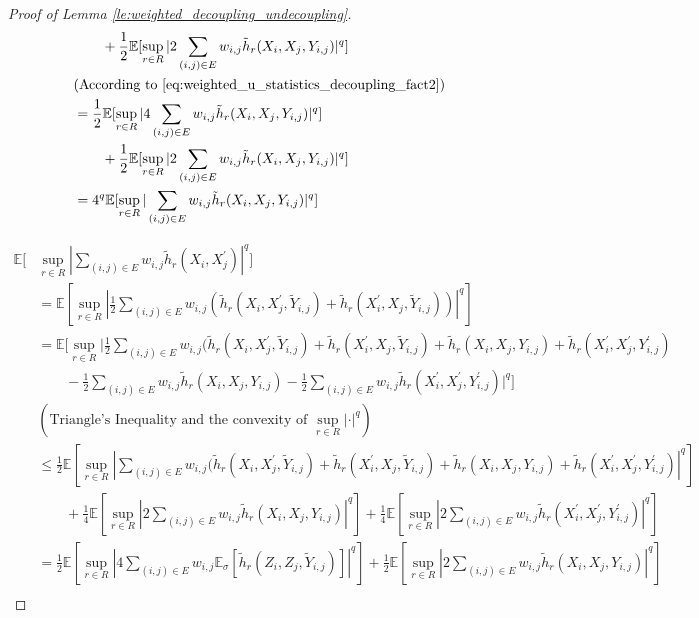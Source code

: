 \documentclass[letterpaper]{article} %
\def\DoubleColumnEnd{}
\def\SingleColumn{}
\newcommand{\E}{\mathbb{E}}
\newcommand{\pair}[1]{(#1)}
\begin{document}
\begin{proof}[Proof of Lemma \ref{le:weighted_decoupling_undecoupling}]
\begin{align*}
        &\qquad+ \frac{1}{2}\E[\sup_{r\in R} |2\sum_{\pair{i,j}\in E}w_{i,j}\tilde{h}_r(X_i,X_j,Y_{i,j})|^q]\\
        &(\text{According to }\eqref{eq:weighted_u_statistics_decoupling_fact2})\\
        &= \frac{1}{2}\E[\sup_{r\in R} |4\sum_{\pair{i,j}\in E}w_{i,j}\tilde{h}_r(X_i,X_j,Y_{i,j})|^q] \\
        &\qquad+ \frac{1}{2}\E[\sup_{r\in R} |2\sum_{\pair{i,j}\in E}w_{i,j}\tilde{h}_r(X_i,X_j,Y_{i,j})|^q]\\
        &= 4^q\E[\sup_{r\in R} |\sum_{\pair{i,j}\in E}w_{i,j}\tilde{h}_r(X_i,X_j,Y_{i,j})|^q]
    \end{align*}
    \DoubleColumnEnd
    \SingleColumn
    \begin{align*}
        \E[&\sup_{r\in R} |\sum_{\pair{i,j}\in E}w_{i,j}\tilde{h}_r(X_i,X_j^\prime)|^q]\\
        &=\E[\sup_{r\in R} |\frac{1}{2}\sum_{\pair{i,j}\in E}w_{i,j}(\tilde{h}_r(X_i,X_j^\prime,\tilde{Y}_{i,j})+\tilde{h}_r(X_i^\prime,X_j,\tilde{Y}_{i,j}))|^q]\\
        &= \E[\sup_{r\in R} |\frac{1}{2}\sum_{\pair{i,j}\in E}w_{i,j}(\tilde{h}_r(X_i,X_j^\prime,\tilde{Y}_{i,j})+\tilde{h}_r(X_i^\prime,X_j,\tilde{Y}_{i,j})+\tilde{h}_r(X_i,X_j,Y_{i,j})+\tilde{h}_r(X_i^\prime,X_j^\prime,Y^\prime_{i,j})\\
        &\qquad-\frac{1}{2}\sum_{\pair{i,j}\in E}w_{i,j}\tilde{h}_r(X_i,X_j,Y_{i,j})-\frac{1}{2}\sum_{\pair{i,j}\in E}w_{i,j}\tilde{h}_r(X_i^\prime,X_j^\prime,Y^\prime_{i,j})|^q]\\
        &(\text{Triangle's Inequality and the convexity of }\sup_{r\in R}|\cdot|^q)\\
        &\le \frac{1}{2}\E[\sup_{r\in R} |\sum_{\pair{i,j}\in E}w_{i,j}(\tilde{h}_r(X_i,X_j^\prime,\tilde{Y}_{i,j})+\tilde{h}_r(X_i^\prime,X_j,\tilde{Y}_{i,j})+\tilde{h}_r(X_i,X_j,Y_{i,j})+\tilde{h}_r(X_i^\prime,X_j^\prime,Y^\prime_{i,j})|^q]\\
        &\qquad+\frac{1}{4}\E[\sup_{r\in R} |2\sum_{\pair{i,j}\in E}w_{i,j}\tilde{h}_r(X_i,X_j,Y_{i,j})|^q] + \frac{1}{4}\E[\sup_{r\in R} |2\sum_{\pair{i,j}\in E}w_{i,j}\tilde{h}_r(X_i^\prime,X_j^\prime,Y^\prime_{i,j})|^q]\\
        &= \frac{1}{2}\E[\sup_{r\in R} |4\sum_{\pair{i,j}\in E}w_{i,j}\E_\sigma[\tilde{h}_r(Z_i,Z_j,\tilde{Y}_{i,j})]|^q]+ \frac{1}{2}\E[\sup_{r\in R} |2\sum_{\pair{i,j}\in E}w_{i,j}\tilde{h}_r(X_i,X_j,Y_{i,j})|^q]\\

\end{align*}
\end{proof}
\end{document}

